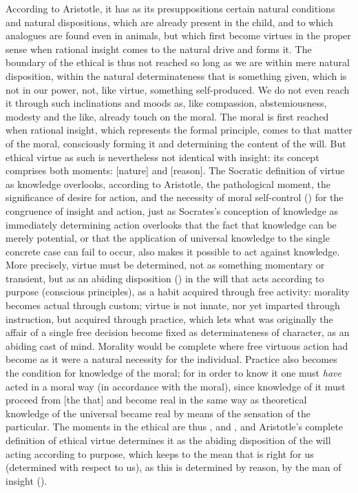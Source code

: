 According to Aristotle, it has as its presuppositions certain
natural conditions and natural dispositions, which are already present in the child, and to which analogues are found even in
animals, but which first become virtues in the proper sense when
rational insight comes to the natural drive and forms it. The boundary of the ethical is thus not
reached so long as we are within mere natural disposition, within the natural determinateness that is something given, which is not in
our power, not, like virtue, something self-produced. We do not even
reach it through such inclinations and moods as,
like compassion, abstemiousness, modesty and the like, already
touch on the moral. The moral is first reached when rational
insight, which represents the formal principle, comes to
that matter of the moral, consciously forming it and determining the content of the will. But ethical virtue as such
is nevertheless not identical with insight: its concept comprises
both moments:  [nature] and  [reason]. The Socratic definition
of virtue as knowledge overlooks, according to Aristotle, the pathological moment, the significance of desire for action, and the necessity of moral self-control () for
the congruence of insight and action, just as Socrates's conception
of knowledge as immediately determining action overlooks
that the fact that knowledge can be merely potential, or that the application of
universal knowledge to the single concrete
case can fail to occur, also makes it possible to act against knowledge.
More precisely, virtue must be determined, not as something momentary
or transient, but as an abiding disposition ()
in the will that acts according to purpose (conscious principles),
as a habit acquired through free activity: morality
becomes actual through custom; virtue is not innate,
nor yet imparted through instruction, but acquired through
practice, which lets what was originally the affair of a single free decision become fixed as determinateness of character, as
an abiding cast of mind. Morality would be complete where
free virtuous action had become as it were a natural necessity for the individual. Practice also becomes the condition for knowledge of the moral; for in order to know it one must
\emph{have} acted in a moral way (in accordance with
the moral), since knowledge of it must proceed from  [the that]
and become real in the same way as theoretical knowledge of the universal became real by means of the sensation of
the particular. The moments in the ethical are thus ,
 and , and Aristotle's complete definition of
ethical virtue determines it as the abiding disposition
of the will acting according to purpose, which keeps to the mean that is right for us
(determined with respect to us), as this
is determined by reason, by the man of insight ().

